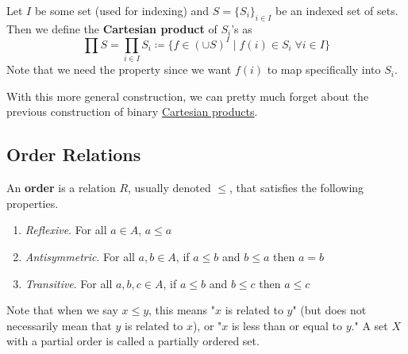   \begin{definition}
    \label{def:cartesian-product}
    Let $I$ be some set (used for indexing) and $S = \{S_i\}_{i \in I}$ be an indexed set of sets. Then we define the \textbf{Cartesian product} of $S_i$'s as 
    \begin{equation}
      \prod S = \prod_{i \in I} S_i \coloneqq \{f \in (\cup S)^I \mid f(i) \in S_i \; \forall i \in I \}
    \end{equation}
    Note that we need the property since we want $f(i)$ to map specifically into $S_i$. 
  \end{definition}

  With this more general construction, we can pretty much forget about the previous construction of binary \hyperref[def:cartesian-product]{Cartesian products}. 

\subsection{Order Relations} 
  
  \begin{definition}
    \label{def:partial-order}
    An \textbf{order} is a relation $R$, usually denoted $\leq$, that satisfies the following properties. 
    \begin{enumerate}
      \item \textit{Reflexive}. For all $a \in A$, $a \leq a$
      \item \textit{Antisymmetric}. For all $a,b \in A$, if $a \leq b$ and $b \leq a$ then $a=b$
      \item \textit{Transitive}. For all $a,b,c \in A$, if $a \leq b$ and $b \leq c$ then $a \leq c$
    \end{enumerate} 
    Note that when we say $x \leq y$, this means "$x$ is related to $y$" (but does not necessarily mean that $y$ is related to $x$), or "$x$ is less than or equal to $y$." A set $X$ with a partial order is called a partially ordered set. 
  \end{definition} 

